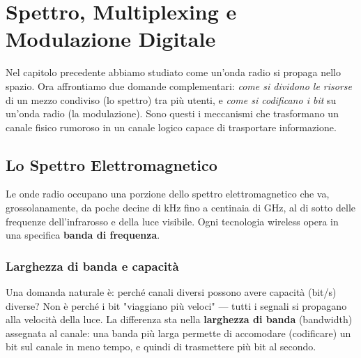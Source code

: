\chapter{Spettro, Multiplexing e Modulazione Digitale}
Nel capitolo precedente abbiamo studiato come un'onda radio si propaga nello spazio. Ora affrontiamo due domande complementari: \emph{come si dividono le risorse} di un mezzo condiviso (lo spettro) tra più utenti, e \emph{come si codificano i bit} su un'onda radio (la modulazione). Sono questi i meccanismi che trasformano un canale fisico rumoroso in un canale logico capace di trasportare informazione.

\section{Lo Spettro Elettromagnetico}
Le onde radio occupano una porzione dello spettro elettromagnetico che va, grossolanamente, da poche decine di kHz fino a centinaia di GHz, al di sotto delle frequenze dell'infrarosso e della luce visibile. Ogni tecnologia wireless opera in una specifica \textbf{banda di frequenza}.


\subsection{Larghezza di banda e capacità}
Una domanda naturale è: perché canali diversi possono avere capacità (bit/s) diverse? Non è perché i bit "viaggiano più veloci" — tutti i segnali si propagano alla velocità della luce. La differenza sta nella \textbf{larghezza di banda} (bandwidth) assegnata al canale: una banda più larga permette di accomodare (codificare) un bit sul canale in meno tempo, e quindi di trasmettere più bit al secondo.


